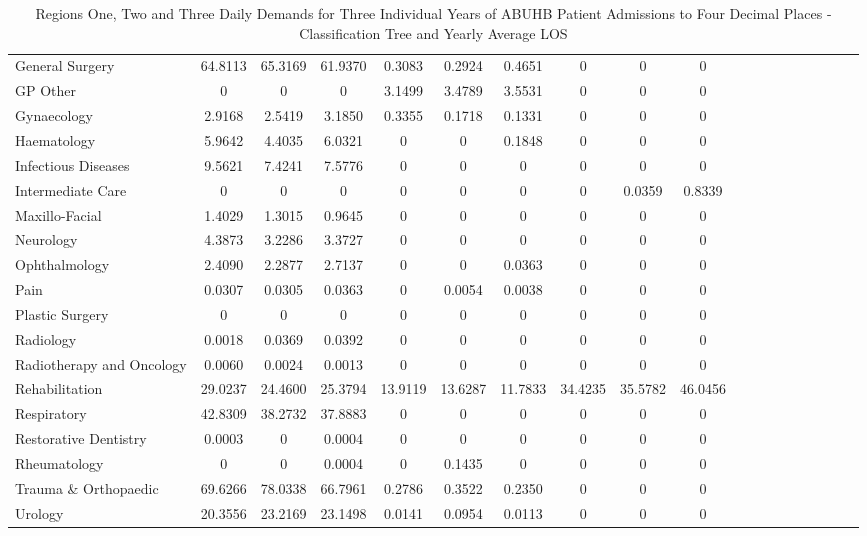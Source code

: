 \documentclass[thesis.tex]{subfiles}
\begin{document}
\begin{landscape}
\begin{table}[h!]
{\begin{tabular}{lcccccccccccccccccc}
General Surgery&	64.8113&	65.3169	&61.9370&	0.3083&	0.2924	&0.4651&	0&	0&	0\\
GP Other	&0	&0	&0	&3.1499&	3.4789	&3.5531&	0	&0&	0\\
Gynaecology&	2.9168	&2.5419	&3.1850&	0.3355&	0.1718&	0.1331	&0	&0&	0\\
Haematology	&5.9642	&4.4035	&6.0321&	0&0&	0.1848&	0	&0	&0\\
Infectious Diseases	&9.5621&	7.4241	&7.5776	&0&	0&	0	&0&	0	&0\\
Intermediate Care	&0	&0	&0&	0&	0&	0	&0&	0.0359	&0.8339\\
Maxillo-Facial	&1.4029	&1.3015&	0.9645&	0&	0&	0&	0&	0	&0\\
Neurology	&4.3873&	3.2286&	3.3727&	0	&0&	0	&0&	0	&0\\
Ophthalmology	&2.4090	&2.2877&	2.7137	&0	&0&0.0363&	0	&0&	0\\
Pain	&0.0307&	0.0305&	0.0363&	0	&0.0054	&0.0038&	0&	0	&0\\
Plastic Surgery&	0	&0&	0&	0	&0&	0&	0&	0	&0\\
Radiology&	0.0018&	0.0369	&0.0392&	0&	0	&0&	0&	0&	0\\
Radiotherapy and Oncology&	0.0060	&0.0024	&0.0013&	0&	0&	0	&0&	0	&0\\
Rehabilitation	&29.0237	&24.4600&	25.3794	&13.9119	&13.6287&	11.7833	&34.4235&	35.5782&	46.0456\\
Respiratory	&42.8309&	38.2732&	37.8883&	0	&0	&0	&0&	0&	0\\
Restorative Dentistry	&0.0003	&0&	0.0004	&0	&0&	0&	0&	0&	0\\
Rheumatology	&0	&0&	0.0004&	0	&0.1435&	0	&0	&0&	0\\
Trauma \& Orthopaedic	&69.6266	&78.0338&	66.7961&	0.2786&	0.3522&	0.2350	&0	&0	&0\\
Urology&	20.3556	&23.2169&	23.1498	&0.0141	&0.0954&	0.0113&	0	&0	&0\\
\bottomrule
\end{tabular}  } 
\caption{Regions One, Two and Three Daily Demands for Three Individual Years of ABUHB Patient Admissions to Four Decimal Places - Classification Tree and Yearly Average LOS}
    \label{apptab:LinkedDemands8a}
\end{table}  



\begin{table}[h!]
    \centering{}
\end{table}
\end{landscape}
\end{document}
